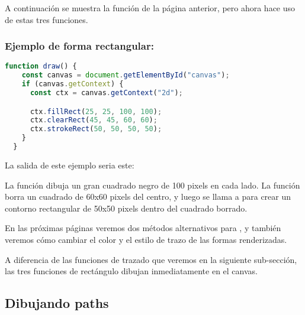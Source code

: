 A continuación se muestra la función  de la página anterior, pero ahora hace uso de estas tres funciones.

\subsubsection*{Ejemplo de forma rectangular:}

\begin{lstlisting}[language=TypeScript, style=mystyle]
  function draw() {
    const canvas = document.getElementById("canvas");
    if (canvas.getContext) {
      const ctx = canvas.getContext("2d");

      ctx.fillRect(25, 25, 100, 100);
      ctx.clearRect(45, 45, 60, 60);
      ctx.strokeRect(50, 50, 50, 50);
    }
  }
\end{lstlisting}
\vspace{0.5cm} %

La salida de este ejemplo seria este:

\vspace{0.5cm} %
\begin{center}
\end{center}
\vspace{0.5cm} %

La función  dibuja un gran cuadrado negro de 100 pixels en cada lado. La función  borra un cuadrado de 60x60 pixels del centro, y luego se llama a  para crear un contorno rectangular de 50x50 pixels dentro del cuadrado borrado.

En las próximas páginas veremos dos métodos alternativos para , y también veremos cómo cambiar el color y el estilo de trazo de las formas renderizadas.

A diferencia de las funciones de trazado que veremos en la siguiente sub-sección, las tres funciones de rectángulo dibujan inmediatamente en el canvas.

\newpage %
\subsection{Dibujando paths}

